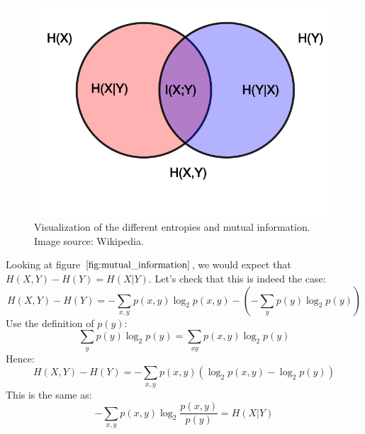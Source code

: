 \documentclass[12pt, a4paper]{article}
\numberwithin{equation}{section}
\begin{document}
\begin{figure}
\centering
\includegraphics[width=\textwidth]{mutual_information}
\caption{Visualization of the different entropies and mutual information. Image source: Wikipedia.}
\label{fig:mutual_information}
\end{figure}

Looking at figure $\ref{fig:mutual_information}$, we would expect that $H(X,Y)-H(Y)=H(X|Y)$. Let's check that this is indeed the case:
\begin{equation}
H(X,Y)-H(Y)=-\sum_{x,y}p(x,y)\log_2 p(x,y)-\left(-\sum_y p(y)\log_2 p(y)\right)
\end{equation}
Use the definition of $p(y)$:
\begin{equation}
\sum_y p(y)\log_2 p(y)=\sum_{xy}p(x,y)\log_2 p(y)
\end{equation}
Hence:
\begin{equation}
H(X,Y)-H(Y)=-\sum_{x,y}p(x,y)\left(\log_2 p(x,y)-\log_2 p(y)\right)
\end{equation}
This is the same as:
\begin{equation}
-\sum_{x,y}p(x,y)\log_2\frac{p(x,y)}{p(y)}=H(X|Y)
\end{equation}
\end{document}
